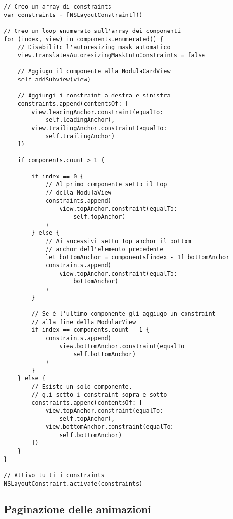 \begin{verbatim}
// Creo un array di constraints
var constraints = [NSLayoutConstraint]()
    
// Creo un loop enumerato sull'array dei componenti
for (index, view) in components.enumerated() {
    // Disabilito l'autoresizing mask automatico
    view.translatesAutoresizingMaskIntoConstraints = false
    
    // Aggiugo il componente alla ModulaCardView
    self.addSubview(view)
    
    // Aggiungi i constraint a destra e sinistra
    constraints.append(contentsOf: [
        view.leadingAnchor.constraint(equalTo: 
            self.leadingAnchor),
        view.trailingAnchor.constraint(equalTo:
            self.trailingAnchor)
    ])
    
    if components.count > 1 {

        if index == 0 {
            // Al primo componente setto il top
            // della ModulaView
            constraints.append(
                view.topAnchor.constraint(equalTo:
                    self.topAnchor)
            )
        } else {
            // Ai sucessivi setto top anchor il bottom
            // anchor dell'elemento precedente
            let bottomAnchor = components[index - 1].bottomAnchor
            constraints.append(
                view.topAnchor.constraint(equalTo:
                    bottomAnchor)
            )
        }
        
        // Se è l'ultimo componente gli aggiugo un constraint
        // alla fine della ModularView
        if index == components.count - 1 {
            constraints.append(
                view.bottomAnchor.constraint(equalTo:
                    self.bottomAnchor)
            )
        }
    } else {
        // Esiste un solo componente,
        // gli setto i constraint sopra e sotto
        constraints.append(contentsOf: [
            view.topAnchor.constraint(equalTo:
                self.topAnchor),
            view.bottomAnchor.constraint(equalTo:
                self.bottomAnchor)
        ])
    }
}

// Attivo tutti i constraints
NSLayoutConstraint.activate(constraints)
\end{verbatim}

\subsection{Paginazione delle animazioni}

